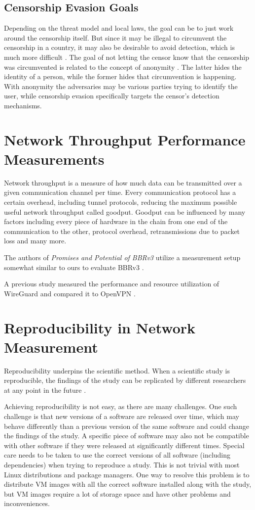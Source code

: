 \subsection{Censorship Evasion Goals}
Depending on the threat model and local laws, the goal can be to just work around the censorship itself.
But since it may be illegal to circumvent the censorship in a country, it may also be desirable to avoid detection, which is much more difficult \cite{Censorship-Circumvention-Tools-Review}.
The goal of not letting the censor know that the censorship was circumvented is related to the concept of anonymity \cite{wiki:Anonymity}.
The latter hides the identity of a person, while the former hides that circumvention is happening.
With anonymity the adversaries may be various parties trying to identify the user, while censorship evasion specifically targets the censor's detection mechanisms.

\section{Network Throughput Performance Measurements}
Network throughput is a measure of how much data can be transmitted over a given communication channel per time.
Every communication protocol has a certain overhead, including tunnel protocols, reducing the maximum possible useful network throughput called goodput.
Goodput can be influenced by many factors including every piece of hardware in the chain from one end of the communication to the other, protocol overhead, retransmissions due to packet loss and many more.

The authors of \textit{Promises and Potential of BBRv3} utilize a measurement setup somewhat similar to ours to evaluate BBRv3 \cite{Promises-and-Potential-of-BBRv3}.

A previous study measured the performance and resource utilization of WireGuard and compared it to OpenVPN \cite{mackey2020performance}.

\section{Reproducibility in Network Measurement}
Reproducibility underpins the scientific method.
When a scientific study is reproducible, the findings of the study can be replicated by different researchers at any point in the future \cite{Replication}.

Achieving reproducibility is not easy, as there are many challenges.
One such challenge is that new versions of a software are released over time, which may behave differently than a previous version of the same software and could change the findings of the study.
A specific piece of software may also not be compatible with other software if they were released at significantly different times.
Special care needs to be taken to use the correct versions of all software (including dependencies) when trying to reproduce a study.
This is not trivial with most Linux distributions and package managers.
One way to resolve this problem is to distribute VM images with all the correct software installed along with the study, but VM images require a lot of storage space and have other problems and inconveniences.


